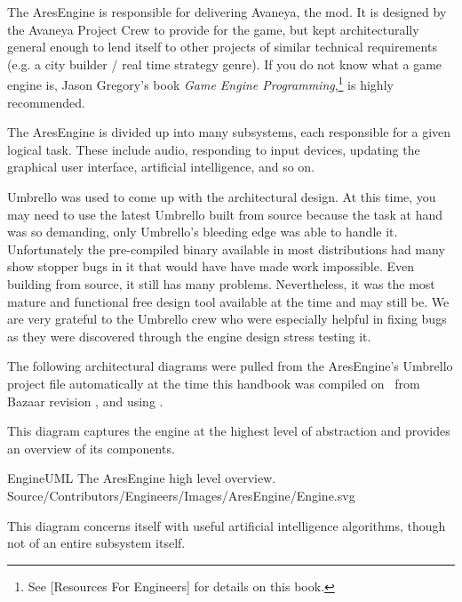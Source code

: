 

The AresEngine is responsible for delivering Avaneya, the mod. It is designed by the Avaneya Project Crew to provide for the game, but kept architecturally general enough to lend itself to other projects of similar technical requirements (e.g. a city builder / real time strategy genre). If you do not know what a game engine is, Jason Gregory's book {\it Game Engine Programming},\footnote{See [Resources For Engineers] for details on this book.} is highly recommended.

The AresEngine is divided up into many subsystems, each responsible for a given logical task. These include audio, responding to input devices, updating the graphical user interface, artificial intelligence, and so on.

Umbrello was used to come up with the architectural design. At this time, you may need to use the latest Umbrello built from source because the task at hand was so demanding, only Umbrello's bleeding edge was able to handle it. Unfortunately the pre-compiled binary available in most distributions had many show stopper bugs in it that would have have made work impossible. Even building from source, it still has many problems. Nevertheless, it was the most mature and functional free design tool available at the time and may still be. We are very grateful to the Umbrello crew who were especially helpful in fixing bugs as they were discovered through the engine design stress testing it.

The following architectural diagrams were pulled from the AresEngine's Umbrello project file automatically at the time this handbook was compiled on \currentdate\ from Bazaar revision \BazaarRevision, and using \UmbrelloVersion.

This diagram captures the engine at the highest level of abstraction and provides an overview of its components.

\FullPageDiagram
    {EngineUML}
    {The AresEngine high level overview.}
    {Source/Contributors/Engineers/Images/AresEngine/Engine.svg}

This diagram concerns itself with useful artificial intelligence algorithms, though not of an entire subsystem itself.

